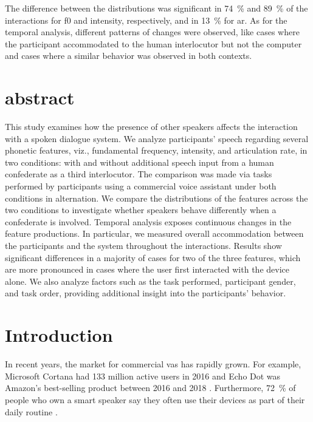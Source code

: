 The difference between the distributions was significant in \SI{74}{\percent} and \SI{89}{\percent} of the interactions for \ac{f0} and intensity, respectively, and in \SI{13}{\percent} for \ac{ar}.
As for the temporal analysis, different patterns of changes were observed, like cases where the participant accommodated to the human interlocutor but not the computer and cases where a similar behavior was observed in both contexts.


\section{abstract}

This study examines how the presence of other speakers affects the interaction with a spoken dialogue system.
We analyze participants' speech regarding several phonetic features, viz., fundamental frequency, intensity, and articulation rate, in two conditions:
with and without additional speech input from a human confederate as a third interlocutor.
The comparison was made via tasks performed by participants using a commercial voice assistant under both conditions in alternation.
We compare the distributions of the features across the two conditions to investigate whether speakers behave differently when a confederate is involved.
Temporal analysis exposes continuous changes in the feature productions.
In particular, we measured overall accommodation between the participants and the system throughout the interactions.
Results show significant differences in a majority of cases for two of the three features, which are more pronounced in cases where the user first interacted with the device alone.
We also analyze factors such as the task performed, participant gender, and task order, providing additional insight into the participants' behavior.

\section{Introduction}
\label{sec:introduction}

In recent years, the market for commercial \acp{va} has rapidly grown.
For example, Microsoft Cortana had 133 million active users in 2016 \citep{Osborne2016why} and Echo Dot was Amazon's best-selling product between 2016 and 2018 \citep{Dickey2017echo}.
Furthermore, \SI{72}{\percent} of people who own a smart speaker say they often use their devices as part of their daily routine \citep{Kleinberg2018ways}.

